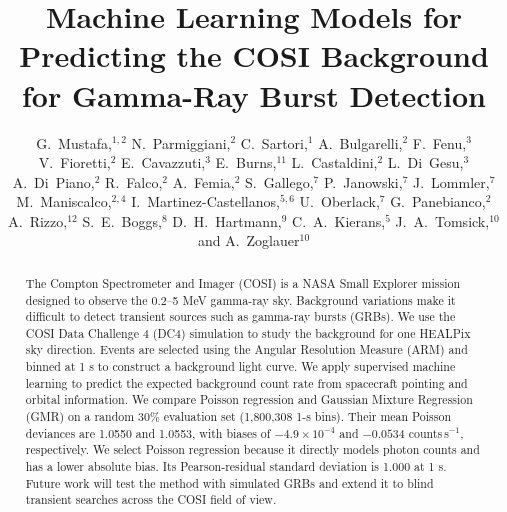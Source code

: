 \documentclass[11pt,twoside]{article}
\begin{document}
\title{Machine Learning Models for Predicting the COSI Background for Gamma-Ray Burst Detection}

\author{G.~Mustafa,$^{1,2}$ N.~Parmiggiani,$^{2}$ C.~Sartori,$^{1}$ A.~Bulgarelli,$^{2}$ F.~Fenu,$^{3}$ 
V.~Fioretti,$^{2}$ E.~Cavazzuti,$^{3}$ E.~Burns,$^{11}$ L.~Castaldini,$^{2}$ L.~Di~Gesu,$^{3}$
A.~Di~Piano,$^{2}$ R.~Falco,$^{2}$ A.~Femia,$^{2}$ S.~Gallego,$^{7}$ P.~Janowski,$^{7}$ J.~Lommler,$^{7}$
M.~Maniscalco,$^{2,4}$ I.~Martinez-Castellanos,$^{5,6}$ U.~Oberlack,$^{7}$ G.~Panebianco,$^{2}$ A.~Rizzo,$^{12}$
S.~E.~Boggs,$^{8}$ D.~H.~Hartmann,$^{9}$ C.~A.~Kierans,$^{5}$ J.~A.~Tomsick,$^{10}$
and A.~Zoglauer$^{10}$}
















\begin{abstract}
The Compton Spectrometer and Imager (COSI) is a NASA Small Explorer mission designed to observe the 0.2--5 MeV gamma-ray sky. Background variations make it difficult to detect transient sources such as gamma-ray bursts (GRBs). We use the COSI Data Challenge 4 (DC4) simulation to study the background for one HEALPix sky direction. Events are selected using the Angular Resolution Measure (ARM) and binned at 1 s to construct a background light curve. We apply supervised machine learning to predict the expected background count rate from spacecraft pointing and orbital information. We compare Poisson regression and Gaussian Mixture Regression (GMR) on a random 30\% evaluation set (1,800,308 1-s bins). Their mean Poisson deviances are 1.0550 and 1.0553, with biases of $-4.9\times10^{-4}$ and $-0.0534$ counts\,s$^{-1}$, respectively. We select Poisson regression because it directly models photon counts and has a lower absolute bias. Its Pearson-residual standard deviation is 1.000 at 1 s. Future work will test the method with simulated GRBs and extend it to blind transient searches across the COSI field of view.
\end{abstract}
\end{document}
